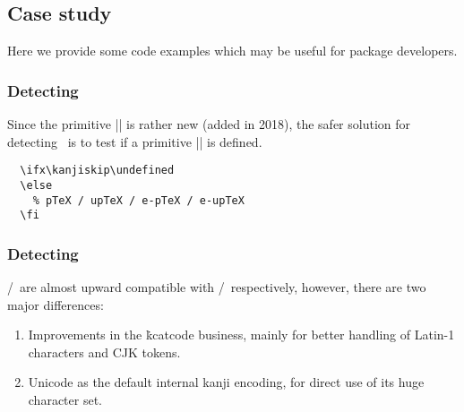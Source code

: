 \documentclass[a4paper,11pt,dvipdfmx]{article}
\def\code#1{\texttt{#1}}
\begin{document}

\subsection{Case study}

Here we provide some code examples
which may be useful for package developers.

\subsubsection{Detecting \pTeX}

Since the primitive |\ptexversion| is rather new (added in 2018),
the safer solution for detecting \pTeX\ is
to test if a primitive |\kanjiskip| is defined.
\begin{verbatim}
  \ifx\kanjiskip\undefined
  \else
    % pTeX / upTeX / e-pTeX / e-upTeX
  \fi
\end{verbatim}

\subsubsection{Detecting \upTeX}

\upTeX/\eupTeX\ are almost upward compatible
with \pTeX/\epTeX\ respectively, however,
there are two major differences:
\begin{enumerate}
  \item Improvements in the \.{kcatcode} business,
    mainly for better handling of Latin-1 characters and CJK tokens.
  \item Unicode as the default internal kanji encoding,
    for direct use of its huge character set.
\end{enumerate}
\end{document}
